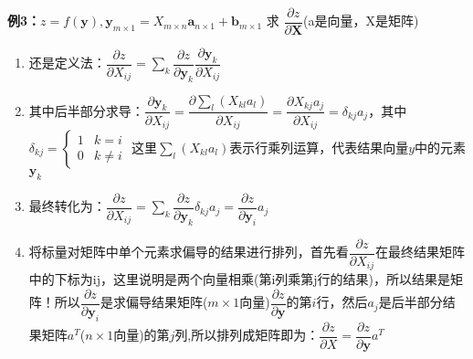     \textbf{例3：}$z=f(\mathbf{y}), \mathbf{y}_{m \times 1}=X_{m\times n} \mathbf{a}_{n\times 1}+\mathbf{b}_{m\times 1}$ 求 $\dfrac{\partial z}{\partial \mathbf{X}}$(a是向量，X是矩阵)
    \begin{enumerate}
        \item 还是定义法：$\dfrac{\partial z}{\partial X_{i j}}=\sum_{k} \dfrac{\partial z}{\partial \bm{y}_{k}} \dfrac{\partial \bm{y}_{k}}{\partial X_{i j}}$
        \item 其中后半部分求导：$\dfrac{\partial \bm{y}_{k}}{\partial X_{i j}} = \dfrac{\partial \sum_{l}\left(X_{k l} a_{l}\right)}{\partial X_{i j}}=\dfrac{\partial X_{k j} a_{j}}{\partial X_{i j}}=\delta_{k j} a_{j}$，其中$\delta_{kj}=\left\{\begin{array}{ll}1 & k=i \\ 0 & k \neq i\end{array}\right.$ 这里$\sum_{l}(X_{k l} a_{l})$表示行乘列运算，代表结果向量$y$中的元素$\bm{y}_{k}$
        \item 最终转化为：$\dfrac{\partial z}{\partial X_{i j}}=\sum_{k} \dfrac{\partial z}{\partial \bm{y}_{k}} \delta_{k j} a_{j} =\dfrac{\partial z}{\partial \bm{y}_{i}} a_{j}$
        \item 将标量对矩阵中单个元素求偏导的结果进行排列，首先看$\dfrac{\partial z}{\partial X_{ij}}$在最终结果矩阵中的下标为ij，这里说明是两个向量相乘(第i列乘第j行的结果)，所以结果是矩阵！所以$\dfrac{\partial z}{\partial \bm{y}_{i}}$是求偏导结果矩阵($m\times 1$向量)$\dfrac{\partial z}{\partial \bm{y}}$的第$i$行，然后$a_{j}$是后半部分结果矩阵$a^T$($n\times 1$向量)的第$j$列,所以排列成矩阵即为：$\dfrac{\partial z}{\partial X}=\dfrac{\partial z}{\partial \bm{y}}a^{T} $
    \end{enumerate}
